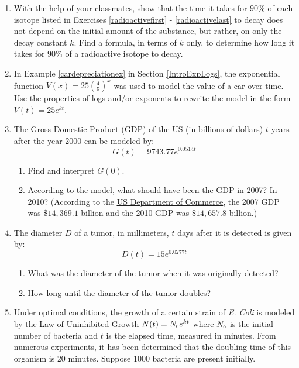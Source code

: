 \begin{enumerate}
\setcounter{enumi}{\value{HW}}

\item With the help of your classmates, show that the time it takes for $90 \%$ of each isotope listed in Exercises \ref{radioactivefirst} - \ref{radioactivelast} to decay does not depend on the initial amount of the substance, but rather, on only the decay constant $k$. Find a formula, in terms of $k$ only, to determine how long it takes for $90 \%$ of a radioactive isotope to decay. 


\item In Example \ref{cardepreciationex} in Section \ref{IntroExpLogs}, the exponential function $V(x) = 25 \left(\frac{4}{5}\right)^{x}$ was used to model the value of a car over time.  Use the properties of logs and/or exponents to rewrite the model in the form $V(t) = 25e^{kt}$.

\item  The Gross Domestic Product (GDP) of the US (in billions of dollars) $t$ years after the year 2000 can be modeled by: \[ G(t) = 9743.77 e^{0.0514t}\]

\begin{enumerate}

\item  Find and interpret $G(0)$.

\item  According to the model, what should have been the GDP in 2007?  In 2010?  (According to the   \href{http://1.usa.gov/iimT40}{\underline{US Department of Commerce}}, the 2007 GDP was $\$14,369.1$ billion and the 2010 GDP was $\$14,657.8$ billion.)

\end{enumerate}

\item  The diameter $D$ of a tumor, in millimeters, $t$ days after it is detected is given by:  \[D(t) = 15e^{0.0277t} \]

\begin{enumerate}

\item  What was the diameter of the tumor when it was originally detected?

\item  How long until the diameter of the tumor doubles?

\end{enumerate}

\item  Under optimal conditions, the growth of a certain strain of \textit{E. Coli} is modeled by the Law of Uninhibited Growth $N(t) = N_{\text{\tiny $0$}} e^{kt}$ where $N_{\text{\tiny $0$}}$ is the initial number of bacteria and $t$ is the elapsed time, measured in minutes. From numerous experiments, it has been determined that the doubling time of this organism is 20 minutes. Suppose 1000 bacteria are present initially.


\end{enumerate}
